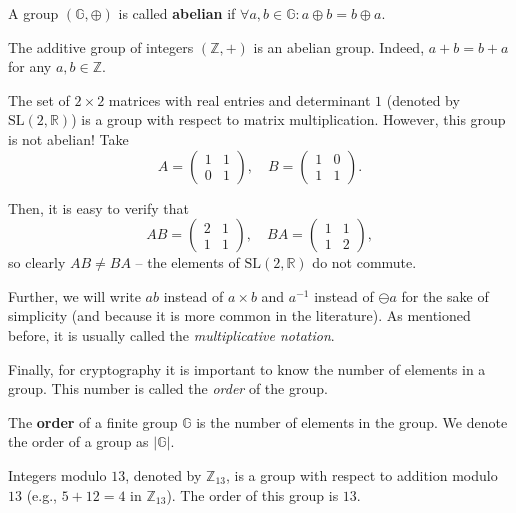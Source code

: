 \documentclass[../lecture-notes.tex]{subfiles}
\begin{document}
\begin{definition}
    A group $(\mathbb{G},\oplus)$ is called \textbf{abelian} if $\forall a,b \in \mathbb{G}: a \oplus b = b \oplus a$.
\end{definition}

\begin{example}
    The additive group of integers $(\mathbb{Z},+)$ is an abelian group. Indeed, $a + b = b + a$ for any $a,b \in \mathbb{Z}$.
\end{example}

\begin{example}
    The set of $2 \times 2$ matrices with real entries and determinant $1$ (denoted by $\text{SL}(2,\mathbb{R})$) is a group with respect to matrix multiplication. However, this group is not abelian! Take
    \begin{equation*}
        A = \begin{pmatrix}
            1 & 1 \\
            0 & 1
        \end{pmatrix}, \quad B = \begin{pmatrix}
            1 & 0 \\
            1 & 1
        \end{pmatrix}.
    \end{equation*}

    Then, it is easy to verify that
    \begin{equation*}
        AB = \begin{pmatrix}
            2 & 1 \\
            1 & 1
        \end{pmatrix}, \quad BA = \begin{pmatrix}
            1 & 1 \\
            1 & 2
        \end{pmatrix},
    \end{equation*}
    so clearly $AB \neq BA$ -- the elements of $\text{SL}(2, \mathbb{R})$ do not commute.
\end{example}

\begin{remark}
    Further, we will write $ab$ instead of $a \times b$ and $a^{-1}$ instead of $\ominus a$ for the sake of simplicity (and because it is more common in the literature). As mentioned before, it is usually called the \textit{multiplicative notation}.
\end{remark}

Finally, for cryptography it is important to know the number of elements in a group. This number is called the \textit{order} of the group.
\begin{definition}
    The \textbf{order} of a finite group $\mathbb{G}$ is the number of elements in the group. We denote the order of a group as $|\mathbb{G}|$.
\end{definition}
\begin{example}
    Integers modulo $13$, denoted by $\mathbb{Z}_{13}$, is a group with respect to addition modulo $13$ (e.g., $5+12=4$ in $\mathbb{Z}_{13}$). The order of this group is $13$.
\end{example}
\end{document}

